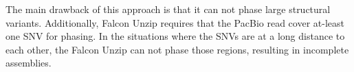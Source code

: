 The main drawback of this approach is that it can not phase large structural variants. Additionally, Falcon Unzip requires that the PacBio read cover at-least one SNV for phasing.
In the situations where the SNVs are at a long distance to each other, the Falcon Unzip can not phase those regions, resulting in incomplete assemblies.
% 


